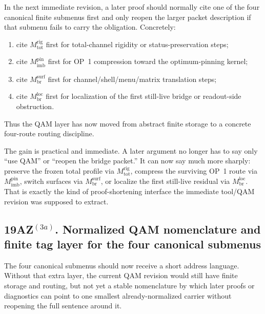 \begin{corollary}
\label{cor:working-citation-rule-next-immediate-revision}
In the next immediate revision, a later proof should normally cite one of the four canonical finite submenus first and only reopen the larger packet description if that submenu fails to carry the obligation. Concretely:
\begin{enumerate}[leftmargin=2em]
  \item cite \(M^{\mathrm{rig}}_{\mathrm{tot}}\) first for total-channel rigidity or status-preservation steps;
  \item cite \(M^{\mathrm{pin}}_{\mathrm{imb}}\) first for OP~1 compression toward the optimum-pinning kernel;
  \item cite \(M^{\mathrm{surf}}_{\mathrm{br}}\) first for channel/shell/menu/matrix translation steps;
  \item cite \(M^{\mathrm{loc}}_{\mathrm{br}}\) first for localization of the first still-live bridge or readout-side obstruction.
\end{enumerate}
Thus the QAM layer has now moved from abstract finite storage to a concrete four-route routing discipline.
\end{corollary}

\begin{remark}
\label{rem:what-gained-before-proving-anything-new-submenus}
The gain is practical and immediate. A later argument no longer has to say only ``use QAM'' or ``reopen the bridge packet.'' It can now say much more sharply: preserve the frozen total profile via \(M^{\mathrm{rig}}_{\mathrm{tot}}\), compress the surviving OP~1 route via \(M^{\mathrm{pin}}_{\mathrm{imb}}\), switch surfaces via \(M^{\mathrm{surf}}_{\mathrm{br}}\), or localize the first still-live residual via \(M^{\mathrm{loc}}_{\mathrm{br}}\). That is exactly the kind of proof-shortening interface the immediate tool/QAM revision was supposed to extract.
\end{remark}

\subsection*{19AZ$^{(3a)}$. Normalized QAM nomenclature and finite tag layer for the four canonical submenus}
\label{sec:normalized-qam-tag-layer}
The four canonical submenus should now receive a short address language. Without that extra layer, the current QAM revision would still have finite storage and routing, but not yet a stable nomenclature by which later proofs or diagnostics can point to one smallest already-normalized carrier without reopening the full sentence around it.

